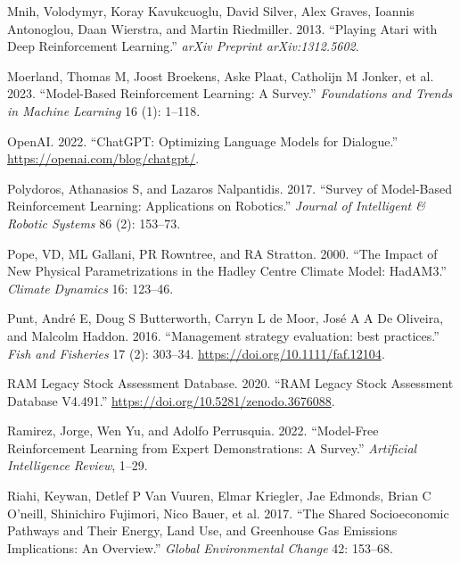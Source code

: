 \documentclass{article}
\newlength{\cslhangindent}
\newlength{\cslentryspacingunit} %
\newenvironment{CSLReferences}[2] %
 {%
  \setlength{\parindent}{0pt}
  \ifodd #1
  \let\oldpar\par
  \def\par{\hangindent=\cslhangindent\oldpar}
  \fi
  \setlength{\parskip}{#2\cslentryspacingunit}
 }%
 {}
\begin{document}
\begin{CSLReferences}{1}{0}
\leavevmode{}%
Mnih, Volodymyr, Koray Kavukcuoglu, David Silver, Alex Graves, Ioannis
Antonoglou, Daan Wierstra, and Martin Riedmiller. 2013. {``Playing Atari
with Deep Reinforcement Learning.''} \emph{arXiv Preprint
arXiv:1312.5602}.

\leavevmode{}%
Moerland, Thomas M, Joost Broekens, Aske Plaat, Catholijn M Jonker, et
al. 2023. {``Model-Based Reinforcement Learning: A Survey.''}
\emph{Foundations and Trends{\textregistered} in Machine Learning} 16
(1): 1--118.

\leavevmode{}%
OpenAI. 2022. {``{C}hat{G}{P}{T}: {O}ptimizing {L}anguage {M}odels for
{D}ialogue.''} \url{https://openai.com/blog/chatgpt/}.

\leavevmode{}%
Polydoros, Athanasios S, and Lazaros Nalpantidis. 2017. {``Survey of
Model-Based Reinforcement Learning: Applications on Robotics.''}
\emph{Journal of Intelligent \& Robotic Systems} 86 (2): 153--73.

\leavevmode{}%
Pope, VD, ML Gallani, PR Rowntree, and RA Stratton. 2000. {``The Impact
of New Physical Parametrizations in the Hadley Centre Climate Model:
HadAM3.''} \emph{Climate Dynamics} 16: 123--46.

\leavevmode{}%
Punt, André E, Doug S Butterworth, Carryn L de Moor, José A A De
Oliveira, and Malcolm Haddon. 2016. {``{Management strategy evaluation:
best practices}.''} \emph{Fish and Fisheries} 17 (2): 303--34.
\url{https://doi.org/10.1111/faf.12104}.

\leavevmode{}%
RAM Legacy Stock Assessment Database. 2020. {``RAM Legacy Stock
Assessment Database V4.491.''}
\url{https://doi.org/10.5281/zenodo.3676088}.

\leavevmode{}%
Ramirez, Jorge, Wen Yu, and Adolfo Perrusquia. 2022. {``Model-Free
Reinforcement Learning from Expert Demonstrations: A Survey.''}
\emph{Artificial Intelligence Review}, 1--29.

\leavevmode{}%
Riahi, Keywan, Detlef P Van Vuuren, Elmar Kriegler, Jae Edmonds, Brian C
O'neill, Shinichiro Fujimori, Nico Bauer, et al. 2017. {``The Shared
Socioeconomic Pathways and Their Energy, Land Use, and Greenhouse Gas
Emissions Implications: An Overview.''} \emph{Global Environmental
Change} 42: 153--68.


\end{CSLReferences}
\end{document}
